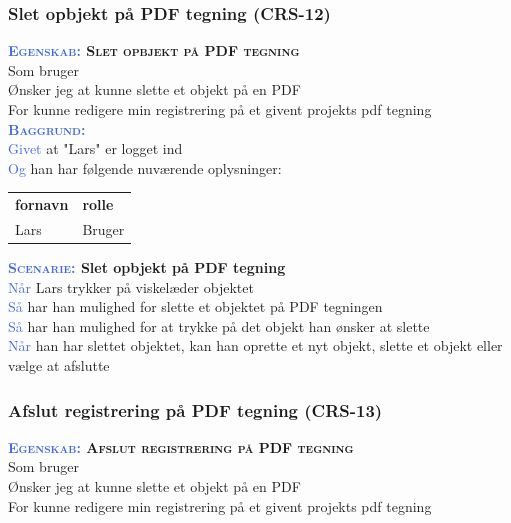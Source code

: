 \subsubsection{Slet opbjekt på PDF tegning (CRS-12)} \label{sec:USSletObjekt}
\textbf{\textsc{\textcolor{RoyalBlue}{Egenskab:} Slet opbjekt på PDF tegning}}\\
Som bruger\\
Ønsker jeg at kunne slette et objekt på en PDF\\
For kunne redigere min registrering på et givent projekts pdf tegning\\

\textsc{\textcolor{RoyalBlue}{\textbf{Baggrund:}}}\\
\textcolor{RoyalBlue}{Givet} at "Lars" er logget ind\\
\textcolor{RoyalBlue}{Og} han har følgende nuværende oplysninger:\\
\begin{tabular}{| l | l |}
	\textbf{fornavn} & \textbf{rolle} \\
	Lars & Bruger\\
\end{tabular}

\textbf{\textsc{\textcolor{RoyalBlue}{Scenarie:}} Slet opbjekt på PDF tegning}\\
\textcolor{RoyalBlue}{Når} Lars trykker på viskelæder objektet\\
\textcolor{RoyalBlue}{Så}  har han mulighed for slette et objektet på PDF tegningen\\
\textcolor{RoyalBlue}{Så}  har han mulighed for at trykke på det objekt han ønsker at slette\\
\textcolor{RoyalBlue}{Når} han har slettet objektet, kan han oprette et nyt objekt, slette et objekt eller vælge at afslutte \\

\subsubsection{Afslut registrering på PDF tegning (CRS-13)} \label{sec:USAfslutRegPåPDF}
\textbf{\textsc{\textcolor{RoyalBlue}{Egenskab:} Afslut registrering på PDF tegning}}\\
Som bruger\\
Ønsker jeg at kunne slette et objekt på en PDF\\
For kunne redigere min registrering på et givent projekts pdf tegning\\

